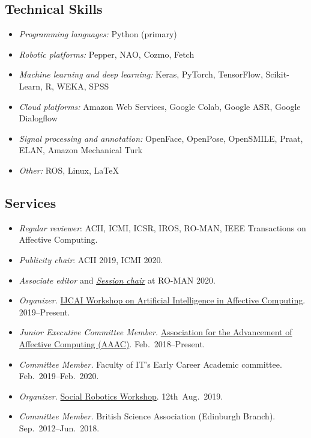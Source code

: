 \documentclass[11pt,letterpaper]{article}
\begin{document}
\subsection*{Technical Skills}
\begin{itemize}
  \item \emph{Programming languages:} Python (primary)
  \item \emph{Robotic platforms:} Pepper, NAO, Cozmo, Fetch
  \item \emph{Machine learning and deep learning:} Keras, PyTorch, TensorFlow, Scikit-Learn, R, WEKA, SPSS
  \item \emph{Cloud platforms:} Amazon Web Services, Google Colab, Google ASR, Google Dialogflow
  \item \emph{Signal processing and annotation:} OpenFace, OpenPose, OpenSMILE, Praat, ELAN, Amazon Mechanical Turk
  \item \emph{Other:} ROS, Linux, \LaTeX
\end{itemize}

\subsection*{Services}
\begin{itemize}
  \item \emph{Regular reviewer}: ACII, ICMI, ICSR, IROS, RO-MAN, IEEE Transactions on Affective Computing.
  \item \emph{Publicity chair}: ACII 2019, ICMI 2020.
  \item \emph{Associate editor} and \href{https://underline.io/events/28/sessions?eventSessionId=365}{\emph{Session chair}} at RO-MAN 2020.
  \item \emph{Organizer.} \href{http://kdd.cs.ksu.edu/Workshops/IJCAI-2020-AffComp/index.html}{IJCAI Workshop on Artificial Intelligence in Affective Computing}. 2019--Present.
  \item \emph{Junior Executive Committee Member.}  \href{https://aaac.cs.nott.ac.uk/}{Association for the Advancement of Affective Computing (AAAC)}. Feb.~2018--Present.
  \item \emph{Committee Member.} Faculty of IT's Early Career Academic committee. Feb.~2019--Feb.~2020.
  \item \emph{Organizer.} \href{https://sites.google.com/monash.edu/socialroboticsworkshop/home}{Social Robotics Workshop}. 12th~Aug.~2019.
  \item \emph{Committee Member.} British Science Association (Edinburgh Branch). Sep.~2012--Jun.~2018.
\end{itemize}
\end{document}
